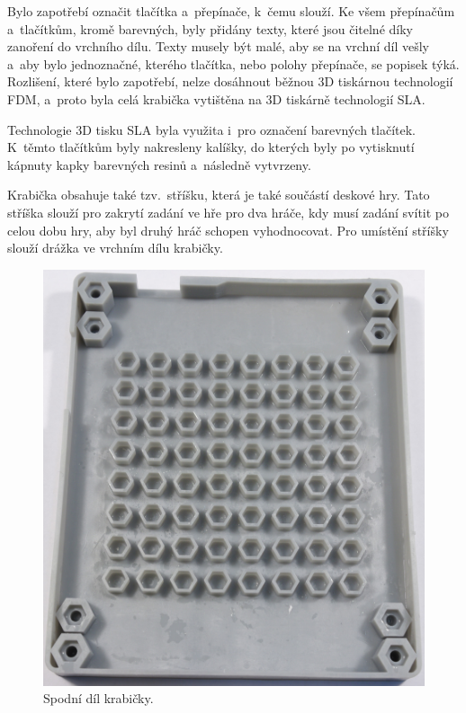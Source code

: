 Bylo zapotřebí označit tlačítka a~přepínače, k~čemu slouží. Ke všem přepínačům a~tlačítkům, kromě barevných, byly přidány texty, které jsou čitelné 
díky zanoření do vrchního dílu. Texty musely být malé, aby se na vrchní díl vešly a~aby bylo jednoznačné, kterého tlačítka, nebo polohy přepínače, se 
popisek týká. Rozlišení, které bylo zapotřebí, nelze dosáhnout běžnou 3D tiskárnou technologií FDM, a~proto byla celá krabička vytištěna na 3D tiskárně 
technologií SLA.

Technologie 3D tisku SLA byla využita i~pro označení barevných tlačítek. K~těmto tlačítkům byly nakresleny kalíšky, do kterých byly po vytisknutí kápnuty
kapky barevných resinů a~následně vytvrzeny. 

Krabička obsahuje také tzv.~stříšku, která je také součástí deskové hry. Tato stříška slouží pro zakrytí zadání ve hře pro dva hráče, kdy 
musí zadání svítit po celou dobu hry, aby byl druhý hráč schopen vyhodnocovat. Pro umístění stříšky slouží drážka ve vrchním dílu krabičky.

\begin{figure}[!h]
  \begin{center}
      \includegraphics[scale=0.3]{obrazky/Krabicka_spodek.jpg}
  \end{center}
  \caption[Spodní díl krabičky]{Spodní díl krabičky.}
  \end{figure}

